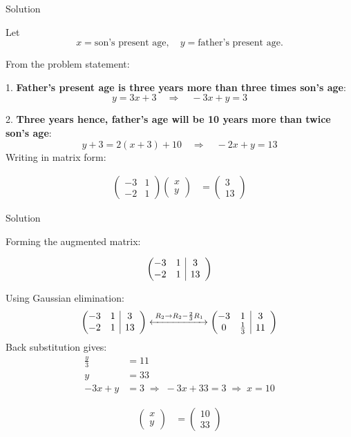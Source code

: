 \documentclass{beamer}
\makeatletter
\numberwithin{equation}{section}
\theoremstyle{remark}
\newcommand{\myvec}[1]{\ensuremath{\begin{pmatrix}#1\end{pmatrix}}}
\newenvironment{amatrix}[1]{%
  \left(\begin{array}{@{}*{#1}{c}|*{#1}{c}@{}}
}{%
  \end{array}\right)
}
\newcommand{\myaugvec}[2]{\ensuremath{\begin{amatrix}{#1}#2\end{amatrix}}}
\makeatother
\begin{document}
\begin{frame}{Solution}


Let 
\[
x = \text{son's present age}, \quad y = \text{father's present age}.
\]

From the problem statement:

1. \textbf{Father's present age is three years more than three times son's age}:
\[
y = 3x + 3 \quad \Rightarrow \quad -3x + y = 3
\]

2. \textbf{Three years hence, father's age will be 10 years more than twice son's age}:
\[
y + 3 = 2(x+3) + 10 \quad \Rightarrow \quad -2x + y = 13
\]
Writing in matrix form:

\begin{align}
\myvec{-3 & 1\\-2 & 1}\myvec{x\\y} &= \myvec{3\\13}
\end{align}
\end{frame}
\begin{frame}{Solution}

Forming the augmented matrix:

\begin{align}
\myaugvec{2}{-3 & 1 & 3\\-2 & 1 & 13}
\end{align}

Using Gaussian elimination:
\begin{align}
\myaugvec{2}{-3 & 1 & 3\\-2 & 1 & 13} 
\xleftrightarrow{\;R_2 \to R_2 - \frac{2}{3}R_1\;}
\myaugvec{2}{-3 & 1 & 3\\0 & \frac{1}{3} & 11}
\end{align}
Back substitution gives:
\begin{align}
\frac{y}{3} &= 11 \\
y &= 33\\
-3x + y &= 3 \;\Rightarrow\; -3x + 33 = 3 \;\Rightarrow\; x = 10
\end{align}

\begin{align}
\myvec{x\\y} &= \myvec{10\\33}
\end{align}
\end{frame}
\end{document}
